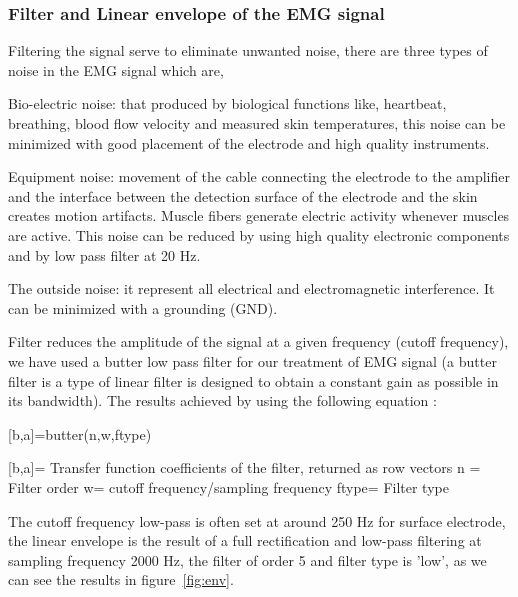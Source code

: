 \documentclass[conference]{IEEEtran}
\begin{document}
\subsubsection{Filter and Linear envelope of the EMG signal } \label{sub:LinearenvelopeoftheEMGsignal}\par
\par Filtering the signal serve to eliminate unwanted noise, there are three types of noise in the EMG signal which are, \par

Bio-electric noise: that produced by biological functions like, heartbeat, breathing, blood flow velocity and measured skin temperatures, this noise can be minimized with good placement of the electrode and high quality instruments.\par

Equipment noise: movement of the cable connecting the electrode to the amplifier and the interface between the detection surface of the electrode and the skin creates motion artifacts. Muscle fibers generate electric activity whenever muscles are active. This noise can be reduced by using high quality electronic components and by low pass filter at 20 Hz.\par

The outside noise: it represent all electrical and electromagnetic interference. It can be minimized with a grounding (GND).\par

Filter reduces the amplitude of the signal at a given frequency (cutoff frequency), we have used a butter low pass filter for our treatment of EMG signal (a butter filter is a type of linear filter is designed to obtain a constant gain as possible in its bandwidth). The results achieved by using the following equation : \par

      [b,a]=butter(n,w,ftype)
      
      [b,a]= Transfer function coefficients of the filter, returned as row vectors
       n = Filter order
       w= cutoff frequency/sampling frequency
       ftype= Filter type
      

The cutoff frequency low-pass is often set at around 250 Hz for surface electrode, the linear envelope is the result of a full rectification and low-pass filtering at sampling frequency 2000 Hz, the filter of order 5 and filter type is 'low', as we can see the results in figure~\ref{fig:env}.\par
\end{document}
